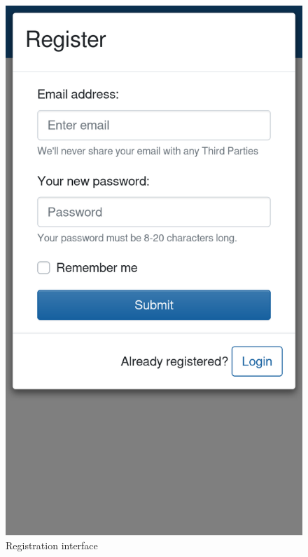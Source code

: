 \begin{figure}[H]
    \centering
    \includegraphics[scale=0.25]{Images/registration_mockup.png}
    \caption{Registration interface}
\end{figure}

